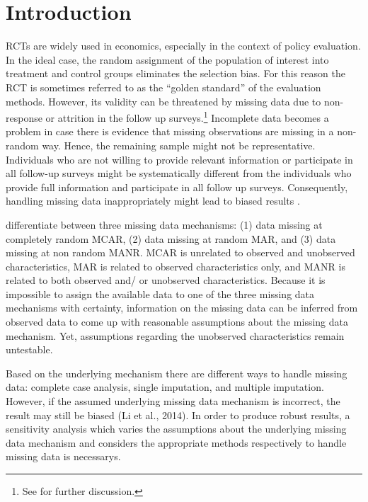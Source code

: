 \section{Introduction}


\acp{RCT} are widely used in economics, especially in the context of policy evaluation. In the ideal case, the random assignment of the population of interest into treatment and control groups eliminates the selection bias. For this reason the \ac{RCT} is sometimes referred to as the ``golden standard'' of the evaluation methods. 
However, its validity can be threatened by missing data due to non-response or attrition in the follow up surveys.\footnote{See \cite{angrist_mostly_2008} for further discussion.} Incomplete data becomes a problem in case there is evidence that missing observations are missing in a non-random way. Hence, the remaining sample might not be representative. Individuals who are not willing to provide relevant information or participate in all follow-up surveys might be systematically different from the individuals who provide full information and participate in all follow up surveys. Consequently, handling missing data inappropriately might lead to biased results \citep{heckman1976common, lee2009training, kling2007experimental}. 

\cite{little1989analysis} differentiate between three missing data mechanisms: (1) data missing at completely random \ac{MCAR}, (2) data missing at random \ac{MAR}, and (3) data missing at non random \ac{MANR}. \ac{MCAR} is unrelated to observed and unobserved characteristics, \ac{MAR} is related to observed characteristics only, and \ac{MANR} is related to both observed and/ or unobserved characteristics. Because it is impossible to assign the available data to one of the three missing data mechanisms with certainty, information on the missing data can be inferred from observed data to come up with reasonable assumptions about the missing data mechanism. Yet, assumptions regarding the unobserved characteristics remain untestable. 

Based on the underlying mechanism there are different ways to handle missing data: complete case analysis, single imputation, and multiple imputation. However, if the assumed underlying missing data mechanism is incorrect, the result may still be biased (Li et al., 2014). 
In order to produce robust results, a sensitivity analysis which varies the assumptions about the underlying missing data mechanism and considers the appropriate methods respectively to handle missing data is necessarys.

